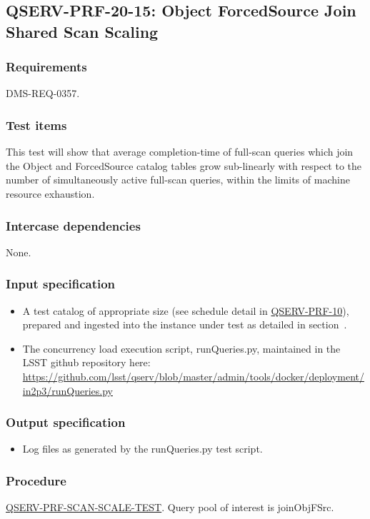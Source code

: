 \subsection{\textsc{QSERV-PRF-20-15}: Object ForcedSource Join Shared Scan Scaling}
\label{qserv-prf-20-15}

\subsubsection{Requirements}

DMS-REQ-0357.

\subsubsection{Test items}

This test will show that average completion-time of full-scan queries which join the Object and ForcedSource 
catalog tables grow sub-linearly with respect to the number of simultaneously active full-scan queries, within 
the limits of machine resource exhaustion.

\subsubsection{Intercase dependencies}

None.

\subsubsection{Input specification}

\begin{itemize}

  \item{A test catalog of appropriate size (see schedule detail in \hyperref[qserv-prf-10]{\textsc{
  QSERV-PRF-10}}), prepared and ingested into the \product{} instance under test as detailed in 
  section~.}

  \item{The concurrency load execution script, runQueries.py, maintained in the LSST \product{}
  github repository here: \url{https://github.com/lsst/qserv/blob/master/admin/tools/docker/deployment/in2p3/runQueries.py}}

\end{itemize}

\subsubsection{Output specification}

\begin{itemize}
  \item{Log files as generated by the runQueries.py test script.}
\end{itemize}

\subsubsection{Procedure}

\hyperref[qserv-prf-scan-scale-test]{\textsc{QSERV-PRF-SCAN-SCALE-TEST}}.
Query pool of interest is joinObjFSrc.